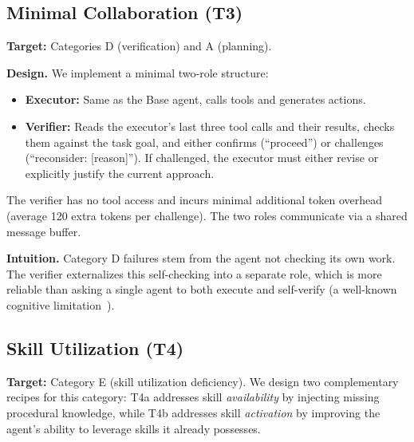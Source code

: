 \subsection{Minimal Collaboration (T3)}
\label{sec:recipes:collab}


\textbf{Target:} Categories D (verification) and A (planning).

\textbf{Design.} We implement a minimal two-role structure:

\begin{itemize}[leftmargin=1.5em, itemsep=1pt]
  \item \textbf{Executor:} Same as the Base agent, calls tools and generates actions.
  \item \textbf{Verifier:} Reads the executor's last three tool calls and their results, checks them against the task goal, and either confirms (``proceed'') or challenges (``reconsider: [reason]''). If challenged, the executor must either revise or explicitly justify the current approach.
\end{itemize}

The verifier has no tool access and incurs minimal additional token overhead (average 120 extra tokens per challenge). The two roles communicate via a shared message buffer.

\textbf{Intuition.} Category D failures stem from the agent not checking its own work. The verifier externalizes this self-checking into a separate role, which is more reliable than asking a single agent to both execute and self-verify (a well-known cognitive limitation~\citep{stanovich2011robot}).


\subsection{Skill Utilization (T4)}
\label{sec:recipes:proc}


\textbf{Target:} Category E (skill utilization deficiency). We design two complementary recipes for this category: T4a addresses skill \emph{availability} by injecting missing procedural knowledge, while T4b addresses skill \emph{activation} by improving the agent's ability to leverage skills it already possesses.

